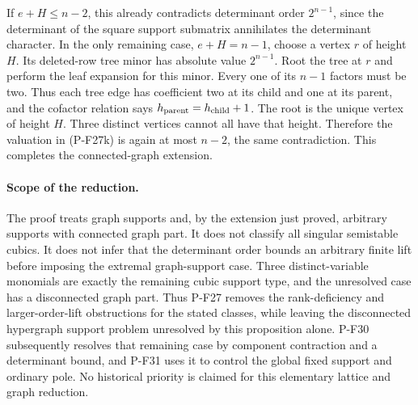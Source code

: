 If $e+H\le n-2$, this already contradicts determinant order
$2^{n-1}$, since the determinant of the square support submatrix
annihilates the determinant character. In the only remaining case,
$e+H=n-1$, choose a vertex $r$ of height $H$. Its deleted-row tree
minor has absolute value $2^{n-1}$. Root the tree at $r$ and perform
the leaf expansion for this minor. Every one of its $n-1$ factors
must be two. Thus each tree edge has coefficient two at its child
and one at its parent, and the cofactor relation says
$h_{\rm parent}=h_{\rm child}+1$. The root is the unique vertex of
height $H$. Three distinct vertices cannot all have that height.
Therefore the valuation in (P-F27k) is again at most $n-2$, the
same contradiction. This completes the connected-graph extension.

\paragraph{Scope of the reduction.}
The proof treats graph supports and, by the extension just proved,
arbitrary supports with connected graph part. It does not classify
all singular semistable cubics. It does not infer
that the determinant order bounds an arbitrary finite lift
before imposing the extremal graph-support case. Three
distinct-variable monomials are exactly the remaining
cubic support type, and the unresolved case has a disconnected
graph part. Thus P-F27 removes the rank-deficiency and
larger-order-lift obstructions for the stated classes, while
leaving the disconnected hypergraph support problem unresolved by
this proposition alone. P-F30 subsequently resolves that remaining
case by component contraction and a determinant bound, and P-F31
uses it to control the global fixed support and ordinary pole.
No historical priority is claimed for this elementary
lattice and graph reduction.
